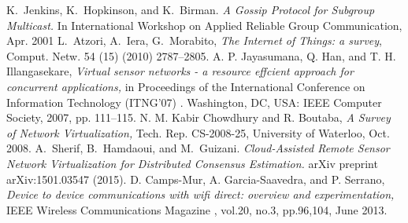 \documentclass[journal]{IEEEtran}
\begin{document}
%
%
%
\begin{thebibliography}{1}

K.~Jenkins, K.~Hopkinson, and K.~Birman. \textit{A Gossip Protocol for Subgroup Multicast.} In International Workshop on Applied Reliable Group Communication,
Apr. 2001
L.~Atzori, A.~Iera, G.~Morabito, \emph{The Internet of Things: a survey},
Comput. Netw. 54 (15) (2010) 2787--2805.
 A. P. Jayasumana, Q. Han, and T. H. Illangasekare, \textit{Virtual sensor networks - a resource effcient approach for concurrent applications,} in
Proceedings of the International Conference on Information
Technology (ITNG'07)
. Washington, DC, USA: IEEE Computer Society, 2007, pp. 111--115.
 N. M. Kabir Chowdhury and R. Boutaba, \textit{A Survey of Network
Virtualization,} Tech. Rep. CS-2008-25, University of Waterloo, Oct.
2008.
A.~Sherif, B.~Hamdaoui, and M.~Guizani. \textit{Cloud-Assisted Remote Sensor Network Virtualization for Distributed Consensus Estimation.} arXiv preprint arXiv:1501.03547 (2015).
 D. Camps-Mur, A. Garcia-Saavedra, and P. Serrano, \textit{Device to device communications with wifi direct: overview and
experimentation,}
IEEE Wireless Communications Magazine
, vol.20, no.3, pp.96,104, June 2013.

\end{thebibliography}

% 
\end{document}

